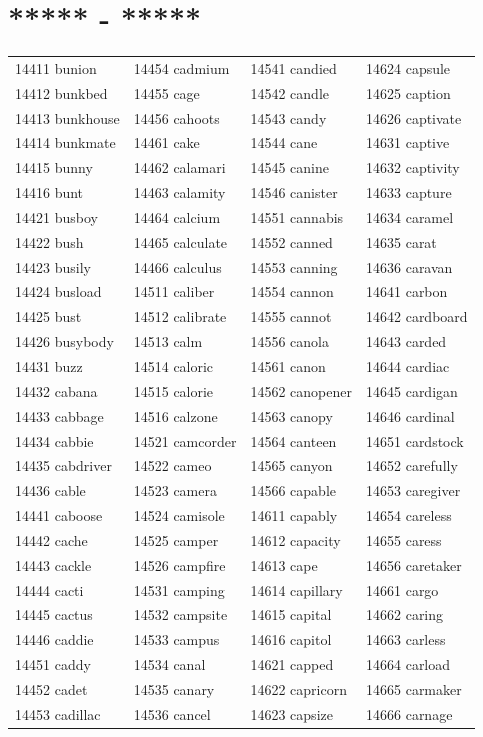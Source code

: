 \documentclass[10pt, oneside]{book}
\begin{document}
\begin{table}
	\centering
	\section*{***** - *****}
	\begin{tabular}{l l l l}
14411 bunion &14454 cadmium &14541 candied &14624 capsule\\
14412 bunkbed &14455 cage &14542 candle &14625 caption\\
14413 bunkhouse &14456 cahoots &14543 candy &14626 captivate\\
14414 bunkmate &14461 cake &14544 cane &14631 captive\\
14415 bunny &14462 calamari &14545 canine &14632 captivity\\
14416 bunt &14463 calamity &14546 canister &14633 capture\\
14421 busboy &14464 calcium &14551 cannabis &14634 caramel\\
14422 bush &14465 calculate &14552 canned &14635 carat\\
14423 busily &14466 calculus &14553 canning &14636 caravan\\
14424 busload &14511 caliber &14554 cannon &14641 carbon\\
14425 bust &14512 calibrate &14555 cannot &14642 cardboard\\
14426 busybody &14513 calm &14556 canola &14643 carded\\
14431 buzz &14514 caloric &14561 canon &14644 cardiac\\
14432 cabana &14515 calorie &14562 canopener &14645 cardigan\\
14433 cabbage &14516 calzone &14563 canopy &14646 cardinal\\
14434 cabbie &14521 camcorder &14564 canteen &14651 cardstock\\
14435 cabdriver &14522 cameo &14565 canyon &14652 carefully\\
14436 cable &14523 camera &14566 capable &14653 caregiver\\
14441 caboose &14524 camisole &14611 capably &14654 careless\\
14442 cache &14525 camper &14612 capacity &14655 caress\\
14443 cackle &14526 campfire &14613 cape &14656 caretaker\\
14444 cacti &14531 camping &14614 capillary &14661 cargo\\
14445 cactus &14532 campsite &14615 capital &14662 caring\\
14446 caddie &14533 campus &14616 capitol &14663 carless\\
14451 caddy &14534 canal &14621 capped &14664 carload\\
14452 cadet &14535 canary &14622 capricorn &14665 carmaker\\
14453 cadillac &14536 cancel &14623 capsize &14666 carnage\\
	\end{tabular}
 \end{table}
\end{document}
